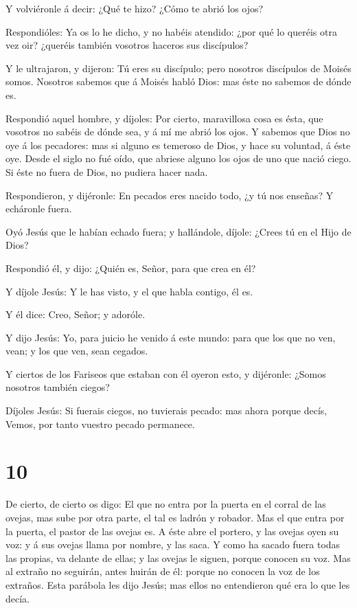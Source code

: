  Y volviéronle á decir: ¿Qué te hizo? ¿Cómo te abrió los
ojos?

 Respondióles: Ya os lo he dicho, y no habéis atendido:
¿por qué lo queréis otra vez oir? ¿queréis también vosotros haceros sus
discípulos?

 Y le ultrajaron, y dijeron: Tú eres su discípulo; pero
nosotros discípulos de Moisés somos.  Nosotros sabemos que
á Moisés habló Dios: mas éste no sabemos de dónde es.

 Respondió aquel hombre, y díjoles: Por cierto, maravillosa
cosa es ésta, que vosotros no sabéis de dónde sea, y á mí me abrió los
ojos.  Y sabemos que Dios no oye á los pecadores: mas si
alguno es temeroso de Dios, y hace su voluntad, á éste oye.
 Desde el siglo no fué oído, que abriese alguno los ojos de
uno que nació ciego.  Si éste no fuera de Dios, no pudiera
hacer nada.

 Respondieron, y dijéronle: En pecados eres nacido todo, ¿y
tú nos enseñas? Y echáronle fuera.

 Oyó Jesús que le habían echado fuera; y hallándole,
díjole: ¿Crees tú en el Hijo de Dios?

 Respondió él, y dijo: ¿Quién es, Señor, para que crea en
él?

 Y díjole Jesús: Y le has visto, y el que habla contigo, él
es.

 Y él dice: Creo, Señor; y adoróle.

 Y dijo Jesús: Yo, para juicio he venido á este mundo: para
que los que no ven, vean; y los que ven, sean cegados.

 Y ciertos de los Fariseos que estaban con él oyeron esto,
y dijéronle: ¿Somos nosotros también ciegos?

 Díjoles Jesús: Si fuerais ciegos, no tuvierais pecado: mas
ahora porque decís, Vemos, por tanto vuestro pecado permanece.

\hypertarget{section-9}{%
\section{10}\label{section-9}}

 De cierto, de cierto os digo: El que no entra por la puerta
en el corral de las ovejas, mas sube por otra parte, el tal es ladrón y
robador.  Mas el que entra por la puerta, el pastor de las
ovejas es.  A éste abre el portero, y las ovejas oyen su
voz: y á sus ovejas llama por nombre, y las saca.  Y como ha
sacado fuera todas las propias, va delante de ellas; y las ovejas le
siguen, porque conocen su voz.  Mas al extraño no seguirán,
antes huirán de él: porque no conocen la voz de los extraños.
 Esta parábola les dijo Jesús; mas ellos no entendieron qué
era lo que les decía.

